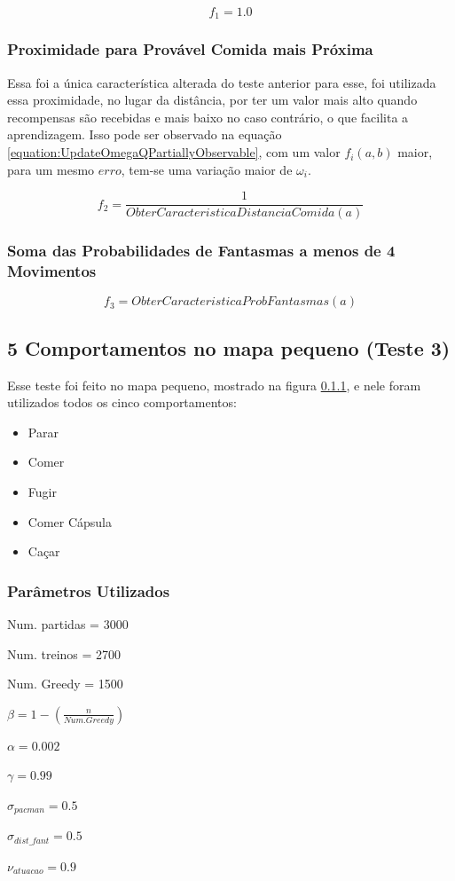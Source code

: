 $$ f_1 = 1.0 $$

\subsubsection*{Proximidade para Provável Comida mais Próxima}

Essa foi a única característica alterada do teste anterior para esse, foi utilizada essa proximidade, no lugar da distância, por ter um valor mais alto quando recompensas são recebidas e mais baixo no caso contrário, o que facilita a aprendizagem. Isso pode ser observado na equação \ref{equation:UpdateOmegaQPartiallyObservable}, com um valor $ f_i \left( a, b \right) $ maior, para um mesmo $ erro $, tem-se uma variação maior de $ \omega_i $.

$$ f_2 = \frac{1}{ObterCaracteristicaDistanciaComida \left( a \right) } $$

\subsubsection*{Soma das Probabilidades de Fantasmas a menos de 4 Movimentos}

$$ f_3 = ObterCaracteristicaProbFantasmas \left( a \right) $$

\subsection{5 Comportamentos no mapa pequeno (Teste 3)} \label{subsection:5ComportamentosMapaPequeno}

Esse teste foi feito no mapa pequeno, mostrado na figura \ref{}, e nele foram utilizados todos os cinco comportamentos:

\begin{itemize}
	\item Parar
	\item Comer
	\item Fugir
	\item Comer Cápsula
	\item Caçar
\end{itemize}

\subsubsection{Parâmetros Utilizados}

\begin{multicols}{2}

Num. partidas = 3000

Num. treinos = 2700

Num. Greedy = 1500

$ \beta = 1 - \left( \frac{n}{Num. Greedy} \right) $

$ \alpha = 0.002 $

$ \gamma = 0.99 $

$ \sigma_{pacman} = 0.5 $

$ \sigma_{dist\_fant} = 0.5 $

$ \nu_{atuacao} = 0.9 $

\end{multicols}

